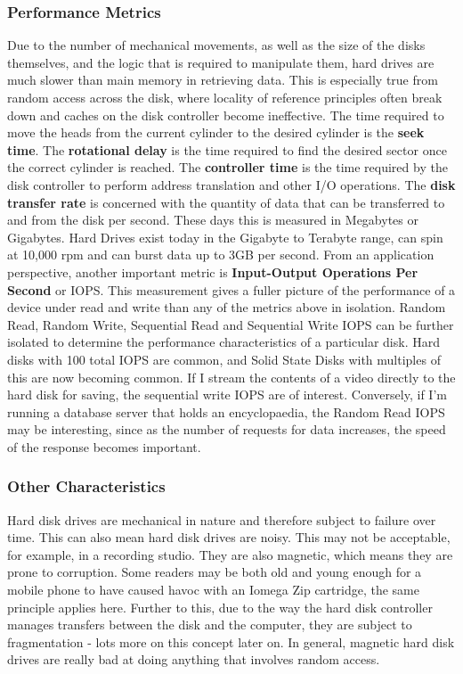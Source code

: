 \documentclass[10pt,a4paper]{article}
\begin{document}
\subsubsection{Performance Metrics}
Due to the number of mechanical movements, as well as the size of the disks themselves, and the logic that is required to manipulate them, hard drives are much slower than main memory in retrieving data. This is especially true from random access across the disk, where locality of reference principles often break down and caches on the disk controller become ineffective. \newline\newline The time required to move the heads from the current cylinder to the desired cylinder is the {\bf seek time}. The {\bf rotational delay} is the time required to find the desired sector once the correct cylinder is reached. The {\bf controller time} is the time required by the disk controller to perform address translation and other I/O operations. The {\bf disk transfer rate} is concerned with the quantity of data that can be transferred to and from the disk per second. These days this is measured in Megabytes or Gigabytes. Hard Drives exist today in the Gigabyte to Terabyte range, can spin at 10,000 rpm and can burst data up to 3GB per second. \newline\newline
From an application perspective, another important metric is {\bf Input-Output Operations Per Second} or IOPS. This measurement gives a fuller picture of the performance of a device under read and write than any of the metrics above in isolation. Random Read, Random Write, Sequential Read and Sequential Write IOPS can be further isolated to determine the performance characteristics of a particular disk. Hard disks with 100 total IOPS are common, and Solid State Disks with multiples of this are now becoming common. If I stream the contents of a video directly to the hard disk for saving, the sequential write IOPS are of interest. Conversely, if I'm running a database server that holds an encyclopaedia, the Random Read IOPS may be interesting, since as the number of requests for data increases, the speed of the response becomes important. 
\subsubsection{Other Characteristics}
Hard disk drives are mechanical in nature and therefore subject to failure over time. This can also mean hard disk drives are noisy. This may not be acceptable, for example, in a recording studio. They are also magnetic, which means they are prone to corruption. Some readers may be both old and young enough for a mobile phone to have caused havoc with an Iomega Zip cartridge, the same principle applies here. Further to this, due to the way the hard disk controller manages transfers between the disk and the computer, they are subject to fragmentation - lots more on this concept later on. In general, magnetic hard disk drives are really bad at doing anything that involves random access. 
\end{document}
